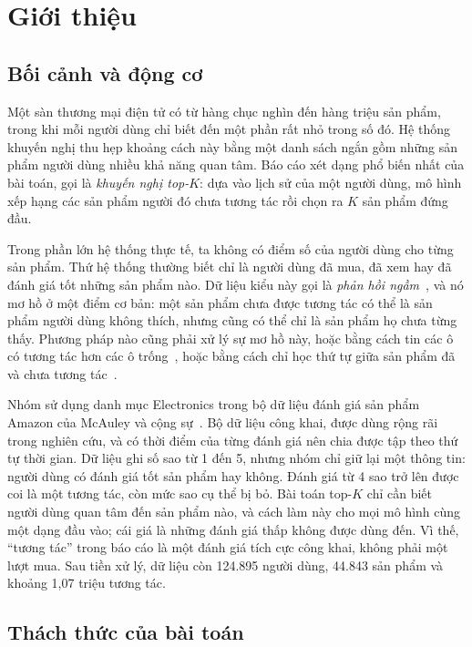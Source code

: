 \section{Giới thiệu}
\label{sec:intro}

\subsection{Bối cảnh và động cơ}
\label{sec:intro-context}

Một sàn thương mại điện tử có từ hàng chục nghìn đến hàng triệu sản phẩm, trong khi mỗi người dùng chỉ biết đến một phần rất nhỏ trong số đó. Hệ thống khuyến nghị thu hẹp khoảng cách này bằng một danh sách ngắn gồm những sản phẩm người dùng nhiều khả năng quan tâm. Báo cáo xét dạng phổ biến nhất của bài toán, gọi là \emph{khuyến nghị top-$K$}: dựa vào lịch sử của một người dùng, mô hình xếp hạng các sản phẩm người đó chưa tương tác rồi chọn ra $K$ sản phẩm đứng đầu.

Trong phần lớn hệ thống thực tế, ta không có điểm số của người dùng cho từng sản phẩm. Thứ hệ thống thường biết chỉ là người dùng đã mua, đã xem hay đã đánh giá tốt những sản phẩm nào. Dữ liệu kiểu này gọi là \emph{phản hồi ngầm}~\cite{hu2008wmf}, và nó mơ hồ ở một điểm cơ bản: một sản phẩm chưa được tương tác có thể là sản phẩm người dùng không thích, nhưng cũng có thể chỉ là sản phẩm họ chưa từng thấy. Phương pháp nào cũng phải xử lý sự mơ hồ này, hoặc bằng cách tin các ô có tương tác hơn các ô trống~\cite{hu2008wmf}, hoặc bằng cách chỉ học thứ tự giữa sản phẩm đã và chưa tương tác~\cite{rendle2009bpr}.

Nhóm sử dụng danh mục Electronics trong bộ dữ liệu đánh giá sản phẩm Amazon của McAuley và cộng sự~\cite{mcauley2015image,he2016ups}. Bộ dữ liệu công khai, được dùng rộng rãi trong nghiên cứu, và có thời điểm của từng đánh giá nên chia được tập theo thứ tự thời gian. Dữ liệu ghi số sao từ 1 đến 5, nhưng nhóm chỉ giữ lại một thông tin: người dùng có đánh giá tốt sản phẩm hay không. Đánh giá từ 4 sao trở lên được coi là một tương tác, còn mức sao cụ thể bị bỏ. Bài toán top-$K$ chỉ cần biết người dùng quan tâm đến sản phẩm nào, và cách làm này cho mọi mô hình cùng một dạng đầu vào; cái giá là những đánh giá thấp không được dùng đến. Vì thế, ``tương tác'' trong báo cáo là một đánh giá tích cực công khai, không phải một lượt mua. Sau tiền xử lý, dữ liệu còn 124.895 người dùng, 44.843 sản phẩm và khoảng 1,07 triệu tương tác.

\subsection{Thách thức của bài toán}
\label{sec:intro-challenges}

